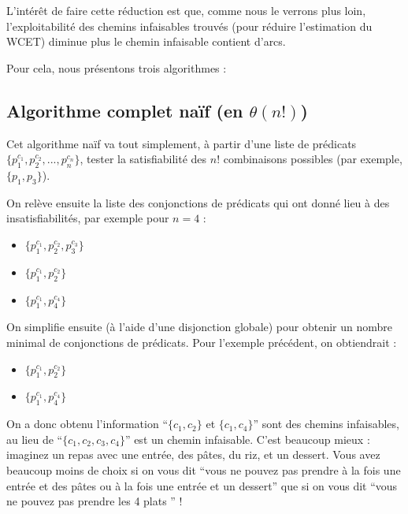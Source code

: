 \documentclass[french]{article}
\begin{document}
  L'intérêt de faire cette réduction est que, comme nous le verrons plus loin, %
  l'exploitabilité des chemins infaisables trouvés (pour réduire l'estimation du WCET) diminue plus le chemin infaisable contient d'arcs.
  
  Pour cela, nous présentons trois algorithmes :
  
  \subsection{Algorithme complet naïf (en $\theta(n!)$)}
  Cet algorithme naïf va tout simplement, à partir d'une liste de prédicats $\{p_1^{c_1}, p_2^{c_2}, ..., p_n^{c_n}\}$, tester la satisfiabilité des $n!$ combinaisons possibles (par exemple, $\{p_1, p_3\}$).
  
  On relève ensuite la liste des conjonctions de prédicats qui ont donné lieu à des insatisfiabilités, par exemple pour $n = 4$ :
  
  \begin{itemize}
    \item $\{p_1^{c_1}, p_2^{c_2}, p_3^{c_3}\}$
    \item $\{p_1^{c_1}, p_2^{c_2}\}$
    \item $\{p_1^{c_1}, p_4^{c_4}\}$
  \end{itemize}
  
  On simplifie ensuite (à l'aide d'une disjonction globale) pour obtenir un nombre minimal de conjonctions de prédicats. Pour l'exemple précédent, on obtiendrait :
  
  \begin{itemize}
    \item $\{p_1^{c_1}, p_2^{c_2}\}$
    \item $\{p_1^{c_1}, p_4^{c_4}\}$
  \end{itemize}
  
  On a donc obtenu l'information ``$\{c_1, c_2\}$ et $\{c_1, c_4\}$'' sont des chemins infaisables, au lieu de ``$\{c_1, c_2, c_3, c_4\}$'' est un chemin infaisable. C'est beaucoup mieux : imaginez un repas avec une entrée, des pâtes, du riz, et un dessert. Vous avez beaucoup moins de choix si on vous dit ``vous ne pouvez pas prendre à la fois une entrée et des pâtes ou à la fois une entrée et un dessert'' que si on vous dit ``vous ne pouvez pas prendre les 4 plats '' !
  
\end{document}
